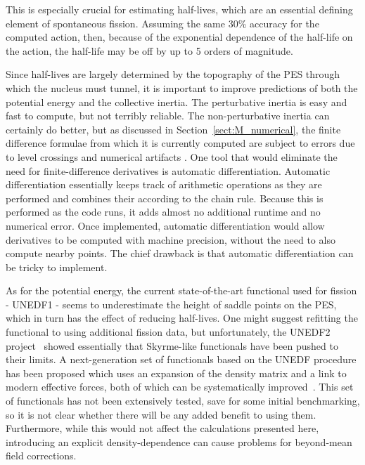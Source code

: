 This is especially crucial for estimating half-lives, which are an essential defining element of spontaneous fission. Assuming the same 30\% accuracy for the computed action, then, because of the exponential dependence of the half-life on the action, the half-life may be off by up to 5 orders of magnitude.



Since half-lives are largely determined by the topography of the PES through which the nucleus must tunnel, it is important to improve predictions of both the potential energy and the collective inertia. The perturbative inertia is easy and fast to compute, but not terribly reliable. The non-perturbative inertia can certainly do better, but as discussed in Section~\ref{sect:M_numerical}, the finite difference formulae from which it is currently computed are subject to errors due to level crossings and numerical artifacts . One tool that would eliminate the need for finite-difference derivatives is automatic differentiation. Automatic differentiation essentially keeps track of arithmetic operations as they are performed and combines their according to the chain rule. Because this is performed as the code runs, it adds almost no additional runtime and no numerical error. Once implemented, automatic differentiation would allow derivatives to be computed with machine precision, without the need to also compute nearby points. The chief drawback is that automatic differentiation can be tricky to implement.

As for the potential energy, the current state-of-the-art functional used for fission - UNEDF1 - seems to underestimate the height of saddle points on the PES, which in turn has the effect of reducing half-lives. One might suggest refitting the functional to using additional fission data, but unfortunately, the UNEDF2 project~\cite{Kortelainen2014} showed essentially that Skyrme-like functionals have been pushed to their limits. A next-generation set of functionals based on the UNEDF procedure has been proposed which uses an expansion of the density matrix and a link to modern effective forces, both of which can be systematically improved~\cite{NavarroPerez2018}. This set of functionals has not been extensively tested, save for some initial benchmarking, so it is not clear whether there will be any added benefit to using them. Furthermore, while this would not affect the calculations presented here, introducing an explicit density-dependence can cause problems for beyond-mean field corrections. %

